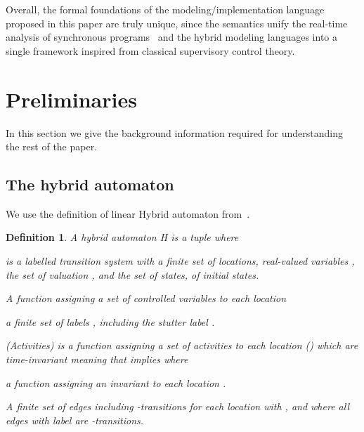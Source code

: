 \documentclass[10pt,journal,cspaper,compsoc]{IEEEtran}
\newtheorem{definition}{Definition}
\begin{document}
Overall, the formal foundations of the modeling/implementation language
proposed in this paper are truly unique, since the semantics unify the
real-time analysis of synchronous programs~\cite{boldt07} and the hybrid
modeling languages into a single framework inspired from classical
supervisory control theory.

\section{Preliminaries}
\label{sec:preliminaries}

In this section we give the background information required for
understanding the rest of the paper.

\subsection{The hybrid automaton}
\label{sec:hybrid-automaton}

We use the definition of linear Hybrid automaton
from~\cite{Henzinger:1996:THA:788018.788803}.

\begin{definition} A \textit{hybrid automaton} \textrm{H} is a tuple
   where
  \begin{compactitem}
    
  \item  is a labelled transition
    system with  a finite set of locations, real-valued variables
    ,  the set of valuation , and
     the set of states, 
    of initial states.
    
  \item A function  assigning a set of
    controlled variables to each location
    
  \item a finite set of labels , including the stutter label
    .

  \item  (Activities) is a function assigning a set of activities
    \mbox{} to each location
    () which are time-invariant meaning that 
    implies \mbox{} where
    \mbox{}
    
  \item a function  assigning an invariant  to
    each location .
    
  \item A finite set
     of edges
    including -transitions  for each location
     with ,
    and where all edges with label  are -transitions.

  \end{compactitem}
\end{definition}
\end{document}
